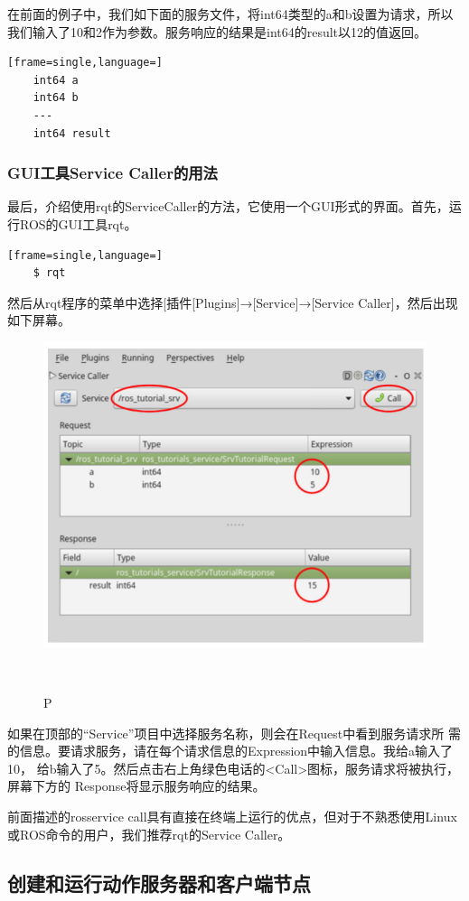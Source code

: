 \documentclass[geye,green,kindle,cn]{elegantnote}
\begin{document}
在前面的例子中，我们如下面的服务文件，将int64类型的a和b设置为请求，所以我们输入了10和2作为参数。服务响应的结果是int64的result以12的值返回。
\begin{lstlisting}[frame=single,language=]
    int64 a 
    int64 b 
    ---
    int64 result 
\end{lstlisting}
\subsubsection{GUI工具Service Caller的用法}
最后，介绍使用rqt的ServiceCaller的方法，它使用一个GUI形式的界面。首先，运行ROS的GUI工具rqt。 
\begin{lstlisting}[frame=single,language=]
    $ rqt 
\end{lstlisting}

然后从rqt程序的菜单中选择[插件[Plugins]→[Service]→[Service Caller]，然后出现如下屏幕。
\begin{figure}[htbp]
    \centering
    \includegraphics[width=1\linewidth]{src/P.png}
    \centering
    \caption{P} \label{picture:P}
\end{figure}

如果在顶部的“Service”项目中选择服务名称，则会在Request中看到服务请求所 需的信息。要请求服务，请在每个请求信息的Expression中输入信息。我给a输入了10， 给b输入了5。然后点击右上角绿色电话的<Call>图标，服务请求将被执行，屏幕下方的 Response将显示服务响应的结果。 

前面描述的rosservice call具有直接在终端上运行的优点，但对于不熟悉使用Linux 或ROS命令的用户，我们推荐rqt的Service Caller。
\subsection{创建和运行动作服务器和客户端节点}
\end{document}
